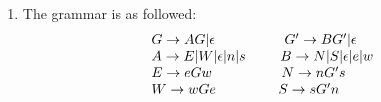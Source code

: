 \documentclass[11pt]{article}
\begin{document}
\begin{enumerate}
\item
The grammar is as followed:
\[
\begin{array}{lr}
	G\rightarrow AG|\epsilon\hspace*{5em} G'\rightarrow BG'|\epsilon \\
	A\rightarrow E | W | \epsilon |n | s\hspace*{2.5em} B\rightarrow N|S|\epsilon|e|w \\
	E\rightarrow eGw \hspace*{5em}N\rightarrow nG's\\
	W\rightarrow wGe \hspace*{4.5em}S\rightarrow sG'n
\end{array}
\]

\end{enumerate}
\end{document}
